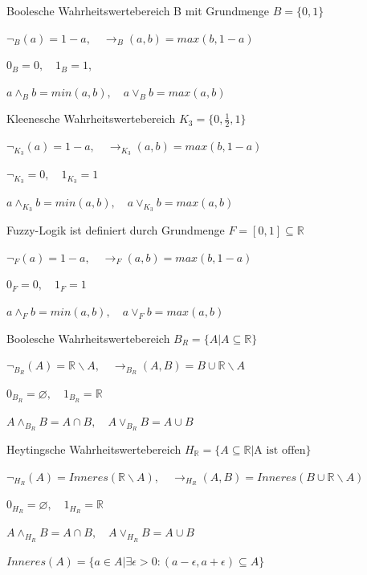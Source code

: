 \documentclass[a4paper]{article}
\begin{document}
\begin{multicols}{3}
  \begin{itemize*}
    \item Boolesche Wahrheitswertebereich B mit Grundmenge $B=\{0,1\}$
    \begin{itemize*}
      \item $\lnot_B (a) = 1-a,\quad\rightarrow_B(a,b) = max(b, 1 -a)$
      \item $0_B=0,\quad 1_B= 1$,
      \item $a\wedge_B b= min(a,b),\quad a\vee_B b= max(a,b)$
    \end{itemize*}
    \item Kleenesche Wahrheitswertebereich $K_3=\{0,\frac{1}{2},1\}$
    \begin{itemize*}
      \item $\lnot_{K_3} (a) = 1 -a,\quad \rightarrow_{K_3} (a,b) = max(b, 1-a)$
      \item $\lnot_{K_3} = 0,\quad 1_{K_3} = 1$
      \item $a\wedge_{K_3} b= min(a,b),\quad a\vee_{K_3} b= max(a,b)$
    \end{itemize*}
    \item Fuzzy-Logik ist definiert durch Grundmenge $F=[0,1]\subseteq\mathbb{R}$
    \begin{itemize*}
      \item $\lnot_F (a) = 1-a,\quad\rightarrow_F (a,b) = max(b, 1-a)$
      \item $0_F= 0,\quad 1_F= 1$
      \item $a\wedge_F b= min(a,b),\quad a\vee_F b= max(a,b)$
    \end{itemize*}
    \item Boolesche Wahrheitswertebereich $B_R=\{A|A\subseteq \mathbb{R}\}$
    \begin{itemize*}
      \item $\lnot_{B_R} (A) =\mathbb{R}\backslash A,\quad \rightarrow_{B_R} (A,B) = B\cup\mathbb{R}\backslash A$
      \item $0_{B_R}=\varnothing,\quad 1_{B_R}=\mathbb{R}$
      \item $A\wedge_{B_R} B=A\cap B,\quad A\vee_{B_R} B=A\cup B$
    \end{itemize*}
    \item Heytingsche Wahrheitswertebereich $H_{\mathbb{R}} =\{A\subseteq\mathbb{R} | \text{A ist offen}\}$
    \begin{itemize*}
      \item $\lnot_{H_R} (A) = Inneres(\mathbb{R}\backslash A),\quad \rightarrow_{H_R} (A,B) =Inneres(B\cup \mathbb{R}\backslash A)$
      \item $0_{H_R}=\varnothing,\quad 1_{H_R}=\mathbb{R}$
      \item $A\wedge_{H_R} B= A\cap B,\quad A\vee_{H_R} B=A\cup B$
      \item $Inneres(A) =\{a\in A|\exists \epsilon > 0 : (a-\epsilon,a+\epsilon)\subseteq A\}$
    \end{itemize*}
  \end{itemize*}


\end{multicols}
\end{document}
